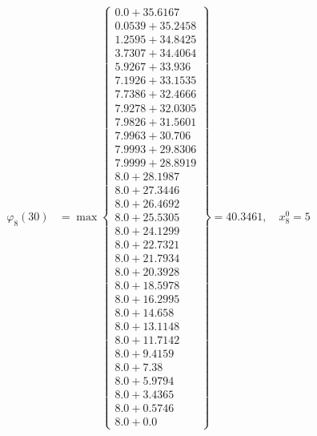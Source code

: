 \documentclass{article}
\begin{document}
\begin{align*}
  
\varphi_{8}(30) &= \max \left\{ \begin{array}{c}
0.0 + 35.6167 \\
 0.0539 + 35.2458 \\
 1.2595 + 34.8425 \\
 3.7307 + 34.4064 \\
 5.9267 + 33.936 \\
 7.1926 + 33.1535 \\
 7.7386 + 32.4666 \\
 7.9278 + 32.0305 \\
 7.9826 + 31.5601 \\
 7.9963 + 30.706 \\
 7.9993 + 29.8306 \\
 7.9999 + 28.8919 \\
 8.0 + 28.1987 \\
 8.0 + 27.3446 \\
 8.0 + 26.4692 \\
 8.0 + 25.5305 \\
 8.0 + 24.1299 \\
 8.0 + 22.7321 \\
 8.0 + 21.7934 \\
 8.0 + 20.3928 \\
 8.0 + 18.5978 \\
 8.0 + 16.2995 \\
 8.0 + 14.658 \\
 8.0 + 13.1148 \\
 8.0 + 11.7142 \\
 8.0 + 9.4159 \\
 8.0 + 7.38 \\
 8.0 + 5.9794 \\
 8.0 + 3.4365 \\
 8.0 + 0.5746 \\
 8.0 + 0.0
\end{array} \right\}=40.3461,\quad x_{8}^0=5\\
  
  
  

\end{align*}
\end{document}
